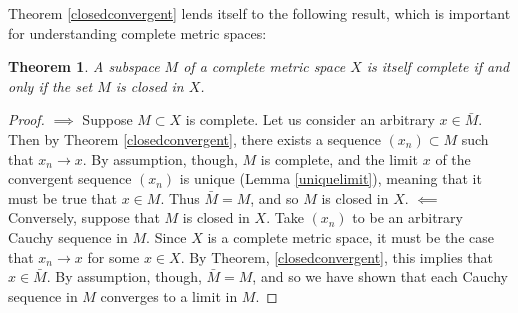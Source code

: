 \documentclass[11pt]{article}
\theoremstyle{mystyle}
\newtheorem{thm}{Theorem}[section]
\newcommand{\0}{\mathbf{0}}
\begin{document}
Theorem \ref{closedconvergent} lends itself to the following result, which is important for understanding complete metric spaces:
\begin{thm}\label{closedcomplete}
A subspace $M$ of a complete metric space $X$ is itself complete if and only if the set $M$ is closed in $X$.
\end{thm}
\begin{proof}
$\implies$ Suppose $M \subset X$ is complete. Let us consider an arbitrary $x \in \bar{M}$. Then by Theorem \ref{closedconvergent}, there exists a sequence $(x_n) \subset M$ such that $x_n \longrightarrow x$. By assumption, though, $M$ is complete, and the limit $x$ of the convergent sequence $(x_n)$ is unique (Lemma \ref{uniquelimit}), meaning that it must be true that $x \in M$. Thus $\bar{M} = M$, and so $M$ is closed in $X$.\newline
$\impliedby$ Conversely, suppose that $M$ is closed in $X$. Take $(x_n)$ to be an arbitrary Cauchy sequence in $M$. Since $X$ is a complete metric space, it must be the case that $x_n \longrightarrow x$ for some $x \in X$. By Theorem, \ref{closedconvergent}, this implies that $x \in \bar{M}$. By assumption, though, $\bar{M} = M$, and so we have shown that each Cauchy sequence in $M$ converges to a limit in $M$.
\end{proof}
\end{document}
